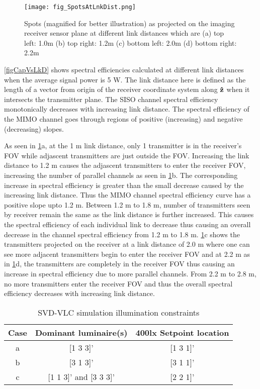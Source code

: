 \begin{figure}[!t]
	\centering
		\texttt{[image: fig\_SpotsAtLnkDist.png]}
	\caption[Spots on sensor at different link distances]{Spots (magnified for better illustration) as projected on the imaging receiver sensor plane at different link distances which are (a) top left: 1.0m (b) top right: 1.2m (c) bottom left: 2.0m (d) bottom right: 2.2m}
	\label{figSpotsVsLink}
\end{figure}

\figurename{ \ref{figCapVsLkD}} shows spectral efficiencies calculated at different link distances when the average signal power is 5 W. The link distance here is defined as the length of a vector from origin of the receiver coordinate system along {$\bf{\hat{z}}$} when it intersects the transmitter plane. The SISO channel spectral efficiency monotonically decreases with increasing link distance. The spectral efficiency of the MIMO channel goes through regions of positive (increasing) and negative (decreasing) slopes. 

As seen in \figurename{ \ref{figSpotsVsLink}}a, at the 1 m link distance, only 1 transmitter is in the receiver's FOV while adjascent transmitters are just outside the FOV. Increasing the link distance to 1.2 m causes the adjascent transmitters to enter the receiver FOV, increasing the number of parallel channels as seen in \figurename{\ref{figSpotsVsLink}}b. The corresponding increase in spectral efficiency is greater than the small decrease caused by the increasing link distance. Thus the MIMO channel spectral efficiency curve has a positive slope upto 1.2 m. Between 1.2 m  to 1.8 m, number of transmitters seen by receiver remain the same as the link distance is further increased. This causes the spectral efficiency of each individual link to decrease thus causing an overall decrease in the channel spectral efficiency from 1.2 m to 1.8 m. \figurename{ \ref{figSpotsVsLink}}c shows the transmitters projected on the receiver at a link distance of 2.0 m where one can see more adjacent transmitters begin to enter the receiver FOV and at 2.2 m as in \figurename{ \ref{figSpotsVsLink}}d, the transmitters are completely in the receiver FOV thus causing an increase in spectral efficiency due to more parallel channels. From 2.2 m to 2.8 m, no more transmitters enter the receiver FOV and thus the overall spectral efficiency decreases with increasing link distance. 

\begin{table}[!t] %
\caption{SVD-VLC simulation illumination constraints}
\label{tblSimulation}
\centering
	\begin{tabular}{|c|c|c|}
		\hline
		{\bf{Case}} & \bf{Dominant luminaire(s)} & \bf{400lx Setpoint location}\\
		\hline
		a & [1 3 3]' & [1 3 1]'\\
		\hline
		b & [3 1 3]' & [3 1 1]'\\
		\hline
		c & [1 1 3]' and [3 3 3]' & [2 2 1]'\\
		\hline
	\end{tabular}
\end{table}


